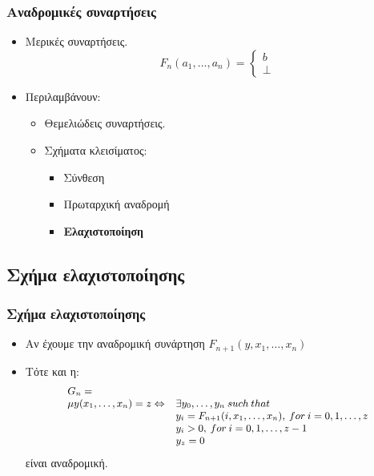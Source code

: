 \documentclass{beamer}
\begin{document}
\begin{frame}
        \frametitle{Αναδρομικές συναρτήσεις}
        \begin{itemize}
                \item Μερικές συναρτήσεις.
                \[F_n(a_1,\ldots,a_n)=\left\{
                        \begin{array}{l}
                                b\\
                                \bot
                        \end{array}
                \right.\]
                \pause 
                \item Περιλαμβάνουν:
                \begin{itemize}
                        \item Θεμελιώδεις συναρτήσεις.
                        \pause
                        \item Σχήματα κλεισίματος:
                        \begin{itemize}
                                \item Σύνθεση
                                \item Πρωταρχική αναδρομή
                                \pause
                                \item \textbf{Ελαχιστοποίηση}
                        \end{itemize}
                \end{itemize}
        \end{itemize}
\end{frame}

\subsection{Σχήμα ελαχιστοποίησης}

\begin{frame}
        \frametitle{Σχήμα ελαχιστοποίησης}
        \begin{itemize}
                \item Αν έχουμε την αναδρομική συνάρτηση \(F_{n+1}(y,x_1,\ldots,x_n)\)
                \pause
                \item Τότε και η:
                \[
                \small
                \begin{array}{ll}
                G_n =\\
                \mu y(x_1,\ldots,x_n) = z \Leftrightarrow 
                & \exists y_0,\ldots,y_n\:such\:that \\
                & y_i = F_{n+1}(i, x_1,\ldots, x_n),\:for\:i=0,1,\ldots,z \\
                & y_i > 0,\:for\:i=0,1,\ldots,z-1 \\
                & y_z = 0
                \end{array}
                \]
                είναι αναδρομική.
        \end{itemize}
\end{frame}
\end{document}
